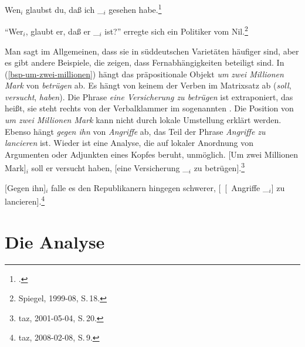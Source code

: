 \ex
\label{ex-wen-glaubst-du-dass}
 Wen$_i$ glaubst du, daß ich \_$_i$ gesehen habe.\footnote{
    .
    }

\ex 
 "`Wer$_i$, glaubt er, daß er \_$_i$ ist?"' erregte sich ein Politiker vom Nil.\footnote{
        Spiegel, 1999-08, S.\,18.
}

\zl
Man sagt im Allgemeinen, dass sie in süddeutschen Varietäten häufiger sind, aber es gibt andere
Beispiele, die zeigen, dass Fernabhängigkeiten beteiligt sind. In (\ref{bsp-um-zwei-millionen}) hängt das
präpositionale Objekt \emph{um zwei Millionen Mark} von
\emph{betrügen} ab. Es hängt
von keinem der Verben im Matrixsatz ab (\emph{soll}, \emph{versucht}, \emph{haben}). Die Phrase \emph{eine Versicherung zu betrügen} ist
extraponiert, das heißt, sie steht rechts von der Verbalklammer im sogenannten \nf. Die
Position von \emph{um zwei Millionen Mark} kann nicht durch lokale Umstellung erklärt werden. Ebenso hängt
\emph{gegen ihn} von \emph{Angriffe} ab, das Teil der Phrase \emph{Angriffe zu
  lancieren} ist. Wieder ist eine Analyse, die auf lokaler Anordnung von Argumenten oder Adjunkten eines Kopfes beruht, unmöglich.
\eal
\label{bsp-Fernabhaengigkeit}
\ex\label{bsp-um-zwei-millionen}
 {}[Um zwei Millionen Mark]$_i$ soll er versucht haben, [eine Versicherung \_$_i$ zu betrügen].\footnote{
         taz, 2001-05-04, S.\,20.
}

\ex
 {}[Gegen ihn]$_i$ falle es den Republikanern hingegen schwerer, [~[~Angriffe \_$_i$] zu lancieren].\footnote{
  taz, 2008-02-08, S.\,9.
}

\zl
{}

\section{Die Analyse}
\label{sec-analysis-verb-mevement}


